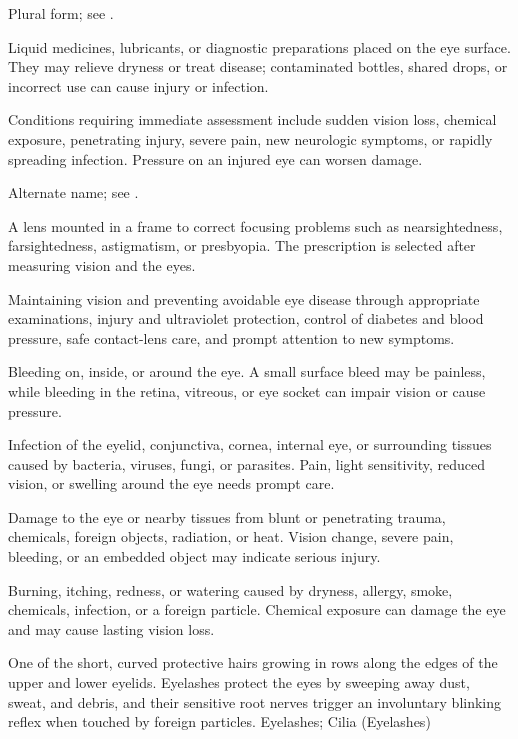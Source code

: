  Plural form; see .

 Liquid medicines, lubricants, or diagnostic preparations placed on the eye surface. They may relieve dryness or treat disease; contaminated bottles, shared drops, or incorrect use can cause injury or infection.

 Conditions requiring immediate assessment include sudden vision loss, chemical exposure, penetrating injury, severe pain, new neurologic symptoms, or rapidly spreading infection. Pressure on an injured eye can worsen damage.

 Alternate name; see .

 A lens mounted in a frame to correct focusing problems such as nearsightedness, farsightedness, astigmatism, or presbyopia. The prescription is selected after measuring vision and the eyes.

 Maintaining vision and preventing avoidable eye disease through appropriate examinations, injury and ultraviolet protection, control of diabetes and blood pressure, safe contact-lens care, and prompt attention to new symptoms.

 Bleeding on, inside, or around the eye. A small surface bleed may be painless, while bleeding in the retina, vitreous, or eye socket can impair vision or cause pressure.

 Infection of the eyelid, conjunctiva, cornea, internal eye, or surrounding tissues caused by bacteria, viruses, fungi, or parasites. Pain, light sensitivity, reduced vision, or swelling around the eye needs prompt care.

 Damage to the eye or nearby tissues from blunt or penetrating trauma, chemicals, foreign objects, radiation, or heat. Vision change, severe pain, bleeding, or an embedded object may indicate serious injury.

 Burning, itching, redness, or watering caused by dryness, allergy, smoke, chemicals, infection, or a foreign particle. Chemical exposure can damage the eye and may cause lasting vision loss.

 One of the short, curved protective hairs growing in rows along the edges of the upper and lower eyelids. Eyelashes protect the eyes by sweeping away dust, sweat, and debris, and their sensitive root nerves trigger an involuntary blinking reflex when touched by foreign particles.
\synonyms
Eyelashes; Cilia (Eyelashes)

